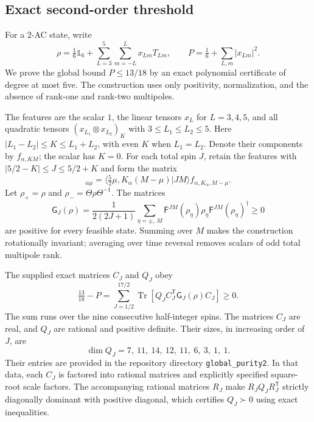 \documentclass[11pt]{article}
\DeclareMathOperator{\Tr}{Tr}
\newcommand{\id}{\mathds{1}}
\begin{document}
\subsection{Exact second-order threshold}
\label{app:spin52_purity2}
For a $2$-AC state, write
\begin{equation}
 \rho=\tfrac16\id_6+
 \sum_{L=3}^{5}\sum_{m=-L}^{L}x_{Lm}T_{Lm},\qquad
 P=\tfrac16+\sum_{L,m}|x_{Lm}|^2.
\end{equation}
We prove the global bound $P\le13/18$ by an exact polynomial
certificate of degree at most five. The construction uses only
positivity, normalization, and the absence of rank-one and rank-two
multipoles.

The features are the scalar $1$, the linear tensors $x_L$ for
$L=3,4,5$, and all quadratic tensors
$(x_{L_1}\otimes x_{L_2})_K$ with $3\le L_1\le L_2\le5$.
Here $|L_1-L_2|\le K\le L_1+L_2$, with even $K$ when $L_1=L_2$.
Denote their components by $f_{\alpha,KM}$; the scalar has $K=0$.
For each total spin $J$, retain the features with
$|5/2-K|\le J\le5/2+K$ and form the matrix
\begin{equation}
 [\mathsf F^{JM}(\rho)]_{\alpha\mu}
 =\langle\tfrac52\mu,K_\alpha(M-\mu)|JM\rangle
 f_{\alpha,K_\alpha,M-\mu}.
\end{equation}
Let $\rho_+=\rho$ and $\rho_-=\Theta\rho\Theta^{-1}$. The matrices
\begin{equation}
 \mathsf G_J(\rho)=\frac1{2(2J+1)}
 \sum_{\eta=\pm,\,M}
 \mathsf F^{JM}(\rho_\eta)\rho_\eta
 \mathsf F^{JM}(\rho_\eta)^\dagger\ge0
\end{equation}
are positive for every feasible state. Summing over $M$ makes the
construction rotationally invariant; averaging over time reversal
removes scalars of odd total multipole rank.

The supplied exact matrices $C_J$ and $Q_J$ obey
\begin{equation}\label{eq:spin52_P2_certificate}
 \boxed{\ \tfrac{13}{18}-P
 =\sum_{J=1/2}^{17/2}
 \Tr\!\left[Q_JC_J^{\mathsf T}\mathsf G_J(\rho)C_J\right]
 \ge0.\ }
\end{equation}
The sum runs over the nine consecutive half-integer spins.
The matrices $C_J$ are real, and $Q_J$ are rational and positive
definite. Their sizes, in increasing order of $J$, are
\begin{equation}
 \dim Q_J=7,\ 11,\ 14,\ 12,\ 11,\ 6,\ 3,\ 1,\ 1.
\end{equation}
Their entries are provided in the repository directory
\texttt{global\_purity2}. In that data, each $C_J$ is factored into
rational matrices and explicitly specified square-root scale factors.
The accompanying rational matrices $R_J$ make
$R_JQ_JR_J^{\mathsf T}$ strictly diagonally dominant with positive
diagonal, which certifies $Q_J\succ0$ using exact inequalities.
\end{document}
